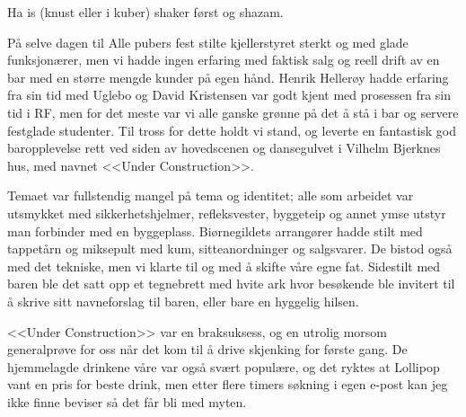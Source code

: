 Ha is (knust eller i kuber) shaker først og shazam.

På selve dagen til Alle pubers fest stilte kjellerstyret sterkt og med glade funksjonærer, men vi hadde ingen erfaring med faktisk salg og reell drift av en bar med en større mengde kunder på egen hånd. Henrik Hellerøy hadde erfaring fra sin tid med Uglebo og David Kristensen var godt kjent med prosessen fra sin tid i RF, men for det meste var vi alle ganske grønne på det å stå i bar og servere festglade studenter. Til tross for dette holdt vi stand, og leverte en fantastisk god baropplevelse rett ved siden av hovedscenen og dansegulvet i Vilhelm Bjerknes hus, med navnet <<Under Construction>>. 

Temaet var fullstendig mangel på tema og identitet; alle som arbeidet var utsmykket med sikkerhetshjelmer, refleksvester, byggeteip og annet ymse utstyr man forbinder med en byggeplass. Biørnegildets arrangører hadde stilt med tappetårn og miksepult med kum, sitteanordninger og salgsvarer. De bistod også med det tekniske, men vi klarte til og med å skifte våre egne fat. Sidestilt med baren ble det satt opp et tegnebrett med hvite ark hvor besøkende ble invitert til å skrive sitt navneforslag til baren, eller bare en hyggelig hilsen.

<<Under Construction>> var en braksuksess, og en utrolig morsom generalprøve for oss når det kom til å drive skjenking for første gang. De hjemmelagde drinkene våre var også svært populære, og det ryktes at Lollipop vant en pris for beste drink, men etter flere timers søkning i egen e-post kan jeg ikke finne beviser så det får bli med myten.
